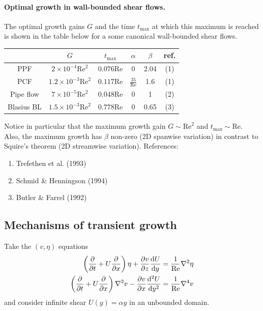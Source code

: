 \documentclass{jknotes}
\newcommand{\ReN}{\text{Re}}
\begin{document}
\paragraph{Optimal growth in wall-bounded shear flows.}
The optimal growth gains $G$ and the time $t_{\max}$ at which this maximum is
reached is shown in the table below for a some canonical wall-bounded shear
flows. 
\begin{table}
	\centering
	\begin{tabular}{c|ccccc}
		& $G$ & $t_{\max}$ & $\alpha$ & $\beta$ & ref.\\ \hline
		PPF & $2\times 10^{-4} \ReN^2$ & $0.076\ReN$ & 0 & 2.04 & (1) \\
		PCF & $1.2\times 10^{-3} \ReN^2$ & $0.117\ReN$ & $\frac{35}{\ReN}$ &
		1.6 & (1) \\
		Pipe flow & $7\times 10^{-5} \ReN^2$ & $0.048\ReN$ & 0 & 1 & (2) \\
		Blasius BL & $1.5\times 10^{-3} \ReN^2$ & $0.778\ReN$ & 0 & 0.65 & (3) \\
	\end{tabular}
\end{table}

Notice in particular that the maximum growth gain $G \sim \ReN^2$ and
$t_{\max} \sim \ReN$. Also, the maximum growth has $\beta$ non-zero (2D
spanwise variation) in contrast to Squire's theorem (2D streamwise variation).
References:
\begin{enumerate}
	\item Trefethen et al. (1993)
	\item Schmid \& Henningson (1994)
	\item Butler \& Farrel (1992)
\end{enumerate}

\subsection{Mechanisms of transient growth}
Take the $(v, \eta)$ equations 
\begin{align}
	\left(\frac{\partial}{\partial t} + U \frac{\partial}{\partial x}\right)
	\eta + \frac{\partial v}{\partial z} \frac{\diffd U}{\diffd y} &=
	\frac{1}{\ReN} \nabla^2 \eta \\
	\left(\frac{\partial}{\partial t} + U \frac{\partial}{\partial x}\right)
	\nabla^2 v - \frac{\partial v}{\partial x} \frac{\diffd^2 U}{\diffd y^2}
								&= \frac{1}{\ReN} \nabla^4 v
\end{align}
and consider infinite shear $U(y) = \alpha y$ in an unbounded domain.
\begin{center}
\end{center}
\end{document}
